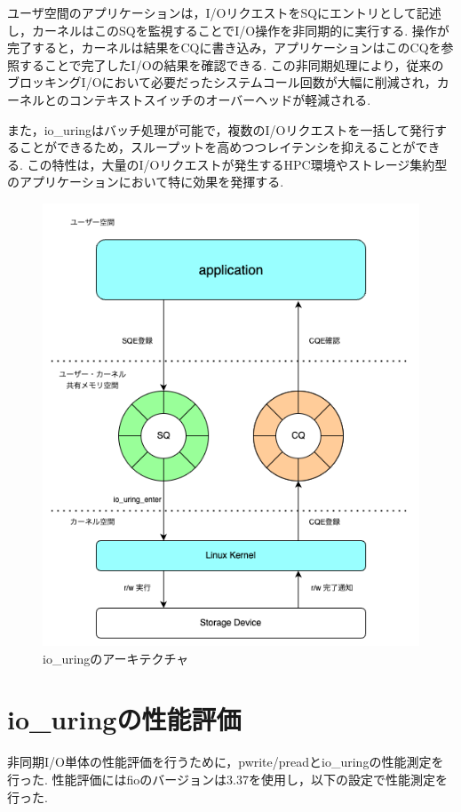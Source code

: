 \documentclass[a4paper,11pt,openany]{jreport}
\begin{document}
ユーザ空間のアプリケーションは，I/OリクエストをSQにエントリとして記述し，カーネルはこのSQを監視することでI/O操作を非同期的に実行する.
操作が完了すると，カーネルは結果をCQに書き込み，アプリケーションはこのCQを参照することで完了したI/Oの結果を確認できる.
この非同期処理により，従来のブロッキングI/Oにおいて必要だったシステムコール回数が大幅に削減され，カーネルとのコンテキストスイッチのオーバーヘッドが軽減される.

また，io\_uringはバッチ処理が可能で，複数のI/Oリクエストを一括して発行することができるため，スループットを高めつつレイテンシを抑えることができる.
この特性は，大量のI/Oリクエストが発生するHPC環境やストレージ集約型のアプリケーションにおいて特に効果を発揮する.

\begin{figure}
	\centering
	\includegraphics[width=12cm, bb=0 0 503 591]{figures/io_uring_arch.png}
	\caption{io\_uringのアーキテクチャ}
	\label{fig:io_uring}
\end{figure}

\section{io\_uringの性能評価}\label{sec:io_uring_eval}
非同期I/O単体の性能評価を行うために，pwrite/preadとio\_uringの性能測定を行った.
性能評価にはfioのバージョンは3.37を使用し，以下の設定で性能測定を行った.
\end{document}
